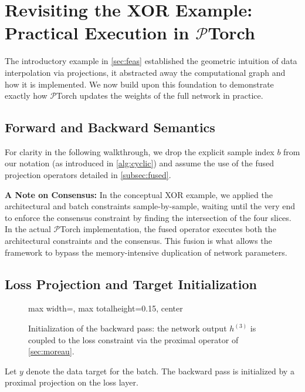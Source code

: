 \section{Revisiting the XOR Example: Practical Execution in \texorpdfstring{$\mathcal{P}$Torch}{��Torch}}
\label{app:walk-through}
The introductory example in \cref{sec:feas} established the geometric intuition of data interpolation via projections, it abstracted away the computational graph and how it is implemented. We now build upon this foundation to demonstrate exactly how $\mathcal{P}$Torch updates the weights of the full network in practice.

\subsection{Forward and Backward Semantics}
For clarity in the following walkthrough, we drop the explicit sample index $b$ from our notation (as introduced in \cref{alg:cyclic}) and assume the use of the fused projection operators detailed in \cref{subsec:fused}.

\begin{tcolorbox}
\textbf{A Note on Consensus:} In the conceptual XOR example, we applied the architectural and batch constraints sample-by-sample, waiting until the very end to enforce the consensus constraint by finding the intersection of the four slices. In the actual $\mathcal{P}$Torch implementation, the fused operator executes both the architectural constraints and the consensus. This fusion is what allows the framework to bypass the memory-intensive duplication of network parameters.
\end{tcolorbox}

\subsection{Loss Projection and Target Initialization}
 
\begin{figure}[htbp]
\centering
\begin{adjustbox}{max width=\textwidth, max totalheight=0.15\textheight, center}

\end{adjustbox}
\caption{Initialization of the backward pass: the network output $h^{(3)}$ is coupled to
the loss constraint via the proximal operator of \cref{sec:moreau}.}
\end{figure}

Let $y$ denote the data target for the batch. The backward pass is initialized by a proximal projection on the loss layer.

